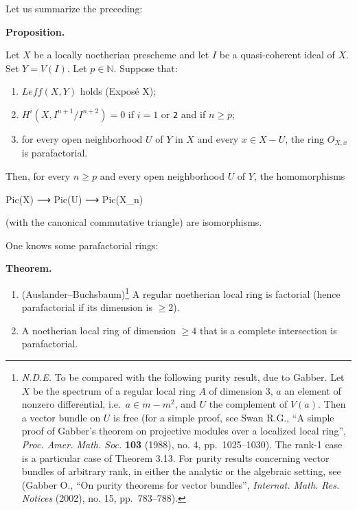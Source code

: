 \documentclass[
  11pt,
  a4paper,
]{book}
\newenvironment{Shaded}{}{}
\newcommand{\NormalTok}[1]{#1}
\providecommand{\tightlist}{%
  \setlength{\itemsep}{0pt}\setlength{\parskip}{0pt}}
\begin{document}
Let us summarize the preceding:

\textbf{Proposition.}

Let \(X\) be a locally noetherian prescheme and let \(I\) be a
quasi-coherent ideal of \(X\). Set \(Y = V(I)\). Let \(p \in
\mathbb{N}\). Suppose that:

\begin{enumerate}
\def\labelenumi{\arabic{enumi}.}
\tightlist
\item
  \(Leff(X, Y)\) holds (Exposé X);
\item
  \(H^{i}(X, I^{n+1}/I^{n+2}) = 0\) if \(i = 1\) or \texttt{2} and if
  \(n \geqslant p\);
\item
  for every open neighborhood \(U\) of \(Y\) in \(X\) and every
  \(x \in X - U\), the ring \(O_{X,x}\) is parafactorial.
\end{enumerate}

Then, for every \(n \geqslant p\) and every open neighborhood \(U\) of
\(Y\), the homomorphisms

\begin{Shaded}
\begin{Highlighting}[]
\NormalTok{Pic(X) ⟶ Pic(U) ⟶ Pic(X\_n)}
\end{Highlighting}
\end{Shaded}

(with the canonical commutative triangle) are isomorphisms.

One knows some parafactorial rings:

\textbf{Theorem.}

\begin{enumerate}
\def\labelenumi{\arabic{enumi}.}
\tightlist
\item
  (Auslander--Buchsbaum)\footnote{\emph{N.D.E.} To be compared with the
    following purity result, due to Gabber. Let \(X\) be the spectrum of
    a regular local ring \(A\) of dimension 3, \(a\) an element of
    nonzero differential, i.e.~\(a \in m - m^{2}\), and \(U\) the
    complement of \(V(a)\). Then a vector bundle on \(U\) is free (for a
    simple proof, see Swan R.G., ``A simple proof of Gabber's theorem on
    projective modules over a localized local ring'', \emph{Proc. Amer.
    Math. Soc.} \textbf{103} (1988), no. 4, pp.~1025--1030). The rank-1
    case is a particular case of Theorem 3.13. For purity results
    concerning vector bundles of arbitrary rank, in either the analytic
    or the algebraic setting, see (Gabber O., ``On purity theorems for
    vector bundles'', \emph{Internat. Math. Res. Notices} (2002), no.
    15, pp.~783--788).} A regular noetherian local ring is factorial
  (hence parafactorial if its dimension is \(\geqslant 2\)).
\item
  A noetherian local ring of dimension \(\geqslant 4\) that is a
  complete intersection is parafactorial.
\end{enumerate}
\end{document}
